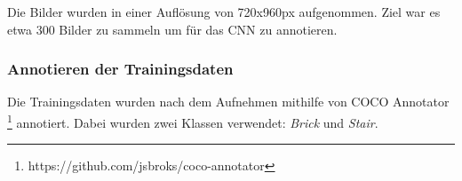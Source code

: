 Die Bilder wurden in einer Auflösung von 720x960px aufgenommen. Ziel war es etwa 300 Bilder zu sammeln um für das \acrshort{CNN} zu annotieren.


\subsubsection{Annotieren der Trainingsdaten}

Die Trainingsdaten wurden nach dem Aufnehmen mithilfe von COCO Annotator \footnote{https://github.com/jsbroks/coco-annotator} annotiert.
Dabei wurden zwei Klassen verwendet: {\it Brick} und {\it Stair}.

